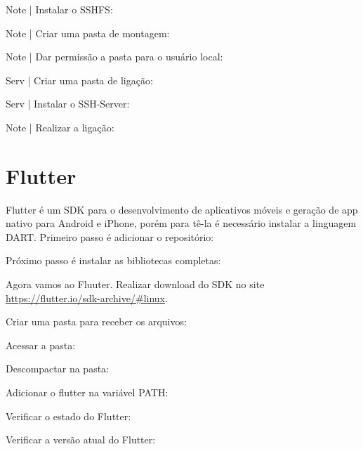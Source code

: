 \documentclass[a4paper,11pt]{article}
\begin{document}
Note | Instalar o SSHFS: \\

Note | Criar uma pasta de montagem: \\

Note | Dar permissão a pasta para o usuário local: \\

Serv | Criar uma pasta de ligação: \\

Serv | Instalar o SSH-Server: \\

Note | Realizar a ligação: \\

\section{Flutter}
Flutter é um SDK para o desenvolvimento de aplicativos móveis e geração de app nativo para Android e iPhone, porém para tê-la é necessário instalar a linguagem DART. Primeiro passo é adicionar o repositório: \\

Próximo passo é instalar as bibliotecas completas: \\

Agora vamos ao Fluuter. Realizar download do SDK no site \url{https://flutter.io/sdk-archive/#linux}.

Criar uma pasta para receber os arquivos: \\

Acessar a pasta: \\

Descompactar na pasta: \\

Adicionar o flutter na variável PATH: \\

Verificar o estado do Flutter: \\

Verificar a versão atual do Flutter: \\
\end{document}
